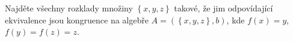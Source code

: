 Najděte všechny rozklady množiny $\left \{ x,y,z \right \}$ takové, že jim
odpovídající ekvivalence jsou kongruence na algebře $A=\left (  \left \{ x,y,z
\right \},b\right )$, kde $f(x)=y$, $f(y)=f(z)=z$.
